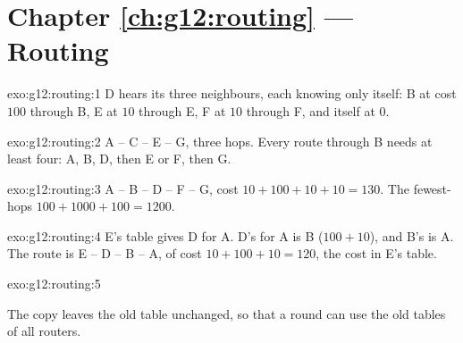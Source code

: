 \section*{Chapter \ref{ch:g12:routing} --- Routing}

\begin{solution}{exo:g12:routing:1}
D hears its three neighbours, each knowing only itself: B at cost $100$ through B, E at $10$ through E, F at $10$
through F, and itself at $0$.
\end{solution}

\begin{solution}{exo:g12:routing:2}
A -- C -- E -- G, three hops. Every route through B needs at least four: A, B, D, then E or F, then G.
\end{solution}

\begin{solution}{exo:g12:routing:3}
A -- B -- D -- F -- G, cost $10 + 100 + 10 + 10 = 130$. The fewest-hops  $100 + 1000 + 100 = 1200$.
\end{solution}

\begin{solution}{exo:g12:routing:4}
E's table gives D for A. D's  for A is B ($100 + 10$), and B's is A. The route is E -- D -- B -- A, of cost
$10 + 100 + 10 = 120$, the cost in E's table.
\end{solution}

\begin{solution}{exo:g12:routing:5}
\smallskip\noindent\hspace*{2em}

\noindent\hspace*{4em}

\noindent\hspace*{4em}

\noindent\hspace*{6em}

\noindent\hspace*{8em}

\noindent\hspace*{4em}

\smallskip\noindent The copy leaves the old table unchanged, so that a round can use the old tables of all routers.
\end{solution}

